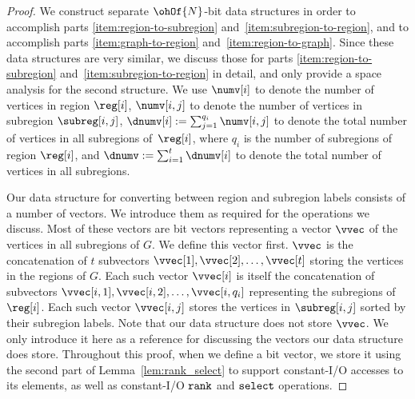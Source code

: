 \begin{proof}
  We construct separate $\ohOf{N}$-bit data structures in order to accomplish parts
  \ref{item:region-to-subregion} and~\ref{item:subregion-to-region}, and to
  accomplish parts \ref{item:graph-to-region} and~\ref{item:region-to-graph}.
  Since these data structures are very similar, we discuss those for
  parts \ref{item:region-to-subregion} and~\ref{item:subregion-to-region} in detail,
  and only provide a space analysis for the second structure.
  We use $\numv[i]$ to denote the number of vertices in region $\reg[i]$,
  $\numv[i,j]$ to denote the number of vertices in subregion $\subreg[i,j]$,
  $\dnumv[i] := \sum_{j=1}^{q_i} \numv[i,j]$ to denote the total number of
  vertices in all subregions of~$\reg[i]$, where $q_i$ is the number of
  subregions of region $\reg[i]$, and $\dnumv := \sum_{i=1}^t \dnumv[i]$ to
  denote the total number of vertices in all subregions.

  Our data structure for converting between region and subregion labels consists
  of a number of vectors.
  We introduce them as required for the operations we discuss.
  Most of these vectors are bit vectors representing a vector $\vvec$
  of the vertices in all subregions of $G$.
  We define this vector first.
  $\vvec$ is the concatenation of $t$ subvectors $\vvec[1], \vvec[2],
  \dots, \vvec[t]$ storing the vertices in the regions of $G$.
  Each such vector $\vvec[i]$ is itself the concatenation of
  subvectors $\vvec[i,1], \vvec[i,2], \dots, \vvec[i,q_i]$ representing
  the subregions of $\reg[i]$.
  Each such vector $\vvec[i,j]$ stores the vertices in $\subreg[i,j]$
  sorted by their subregion labels.
  Note that our data structure does not store $\vvec$.
  We only introduce it here as a reference for discussing the vectors our
  data structure does store.
  Throughout this proof, when we define a bit vector, we store it using
  the second part of Lemma~\ref{lem:rank_select} to support constant-I/O
  accesses to its elements, as well as constant-I/O $\texttt{rank}$ and $\texttt{select}$
  operations.


\end{proof}
